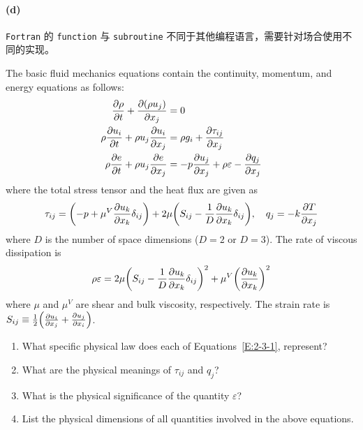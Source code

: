 \paragraph{(d)}
\texttt{Fortran} 的 \texttt{function} 与 \texttt{subroutine} 不同于其他编程语言，需要针对场合使用不同的实现。



\begin{homework}[label={H:2-3}]
    The basic fluid mechanics equations contain the continuity, momentum, and energy equations as follows:
    \begin{subequations}\label{E:2-3-1}
        \begin{align}
            \pdv{\rho}{t} + \pdv{(\rho u_j)}{x_j} &= 0 \label{E:2-3-1-a} \\
            \rho\pdv{u_i}{t} + \rho u_j\pdv{u_i}{x_j} &= \rho g_i + \pdv{\tau_{ij}}{x_j} \label{E:2-3-1-b} \\
            \rho\pdv{e}{t} + \rho u_j\pdv{e}{x_j} &= -p\pdv{u_j}{x_j} + \rho\varepsilon - \pdv{q_j}{x_j} \label{E:2-3-1-c}
        \end{align}
    \end{subequations}
    where the total stress tensor and the heat flux are given as
    \begin{equation}\label{E:2-3-2}
        \tau_{ij} = \qty(-p + \mu^V\pdv{u_k}{x_k}\delta_{ij}) + 2\mu\qty(S_{ij} - \frac{1}{D}\pdv{u_k}{x_k}\delta_{ij}),
        \quad
        q_j = -k\pdv{T}{x_j}
    \end{equation}
    where $D$ is the number of space dimensions ($D=2$ or $D=3$). The rate of viscous dissipation is
    \begin{equation}\label{E:2-3-3}
        \rho\varepsilon = 2\mu\qty(S_{ij} - \frac{1}{D}\pdv{u_k}{x_k}\delta_{ij})^2 + \mu^V\qty(\pdv{u_k}{x_k})^2
    \end{equation}
    where $\mu$ and $\mu^V$ are shear and bulk viscosity, respectively. The strain rate is $S_{ij}\equiv\frac{1}{2}\qty(\pdv{u_i}{x_j}+\pdv{u_j}{x_i})$.

    \begin{enumerate}[label=(\alph*)]
        \item What specific physical law does each of Equations~\eqref{E:2-3-1}, represent?
        \item What are the physical meanings of $\tau_{ij}$ and $q_j$?
        \item What is the physical significance of the quantity $\varepsilon$?
        \item List the physical dimensions of all quantities involved in the above equations.
    \end{enumerate}
\end{homework}

